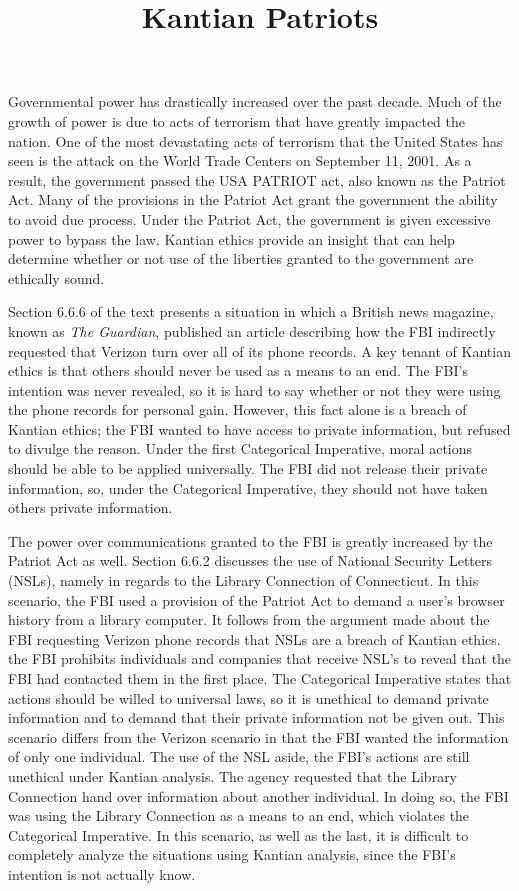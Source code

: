 \documentclass{paper}
\title{Kantian Patriots}
\begin{document}
 \drafth{} \inlinetitle \begin{linenumbers}

Governmental power has drastically increased over the past decade. Much of the growth of power is
due to acts of terrorism that have greatly impacted the nation. One of the most devastating acts of
terrorism that the United States has seen is the attack on the World Trade Centers on September 11,
2001. As a result, the government passed the USA PATRIOT act, also known as the Patriot Act. Many of
the provisions in the Patriot Act grant the government the ability to avoid due process. Under the
Patriot Act, the government is given excessive power to bypass the law. Kantian ethics provide an
insight that can help determine whether or not use of the liberties granted to the government are
ethically sound.

Section 6.6.6 of the text presents a situation in which a British news magazine, known as
\textit{The Guardian}, published an article describing how the FBI indirectly requested that Verizon
turn over all of its phone records. A key tenant of Kantian ethics is that others should never be
used as a means to an end. The FBI's intention was never revealed, so it is hard to say whether or
not they were using the phone records for personal gain. However, this fact alone is a breach of
Kantian ethics; the FBI wanted to have access to private information, but refused to divulge the
reason. Under the first Categorical Imperative, moral actions should be able to be applied
universally. The FBI did not release their private information, so, under the Categorical
Imperative, they should not have taken others private information.

The power over communications granted to the FBI is greatly increased by the Patriot Act as well.
Section 6.6.2 discusses the use of National Security Letters (NSLs), namely in regards to the
Library Connection of Connecticut. In this scenario, the FBI used a provision of the Patriot Act to
demand a user's browser history from a library computer. It follows from the argument made about the
FBI requesting Verizon phone records that NSLs are a breach of Kantian ethics. the FBI prohibits
individuals and companies that receive NSL's to reveal that the FBI had contacted them in the first
place. The Categorical Imperative states that actions should be willed to universal laws, so it is
unethical to demand private information and to demand that their private information not be given
out. This scenario differs from the Verizon scenario in that the FBI wanted the information of only
one individual. The use of the NSL aside, the FBI's actions are still unethical under Kantian
analysis. The agency requested that the Library Connection hand over information about another
individual. In doing so, the FBI was using the Library Connection as a means to an end, which
violates the Categorical Imperative. In this scenario, as well as the last, it is difficult to
completely analyze the situations using Kantian analysis, since the FBI's intention is not actually
know.


\end{linenumbers}
\end{document}
